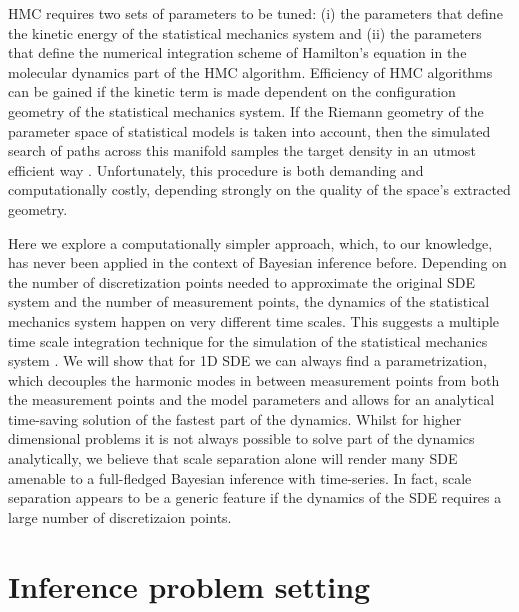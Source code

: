 \documentclass[11pt]{article}
\theoremstyle{definition}
\begin{document}
HMC requires two sets of parameters to be tuned: (i) the parameters that define the kinetic energy of the statistical mechanics system and (ii) the parameters that define the numerical integration scheme of Hamilton's equation in the molecular dynamics part of the HMC algorithm. Efficiency of HMC algorithms can be gained if the kinetic term is made dependent on the configuration geometry of the statistical mechanics system. If the Riemann geometry of the parameter space of statistical models is taken into account, then the simulated search of paths across this manifold samples the target density in an utmost efficient way
    \cite{girolami_2011_HMC}. Unfortunately, this procedure is both demanding and computationally costly,  depending strongly on the quality of the space's extracted geometry.



Here we
explore a computationally simpler approach, which, to our knowledge, has never been applied in the context of Bayesian inference before.
Depending on the number of discretization points needed to approximate the original SDE system and the number of measurement points, the dynamics of the statistical mechanics system happen on very different time scales. This suggests a multiple time scale integration technique for the simulation of the statistical mechanics system \cite{tuckerman_1993}.
We will show that for 1D SDE we can always find a parametrization, which decouples the harmonic modes in between measurement points from both the measurement points and the model parameters and allows for an analytical time-saving solution of the fastest part of the dynamics.
Whilst for higher dimensional problems it is not always possible to solve part of the dynamics analytically, we believe that scale separation alone will render many SDE amenable to a full-fledged Bayesian inference with time-series.
In fact, scale separation appears to be a generic feature if the dynamics of the SDE requires a large number of discretizaion points.

\section{Inference problem setting}
\end{document}
